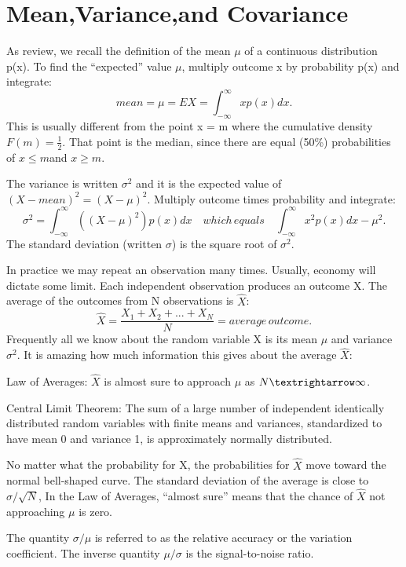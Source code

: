 \section{Mean,Variance,and Covariance}
As review, we recall the definition of the mean $\mu$ of a continuous distribution p(x). To find
the “expected” value $\mu$, multiply outcome x by probability p(x) and integrate:
\begin{equation}
	mean=\mu=E{X}=\int^\infty_{-\infty}xp(x)dx.
\end{equation} 
This is usually different from the point x = m where the cumulative density $F(m)=\frac{1}{2}$.
That point is the median, since there are equal (50\%) probabilities of $x\leq m $and $x \geq m $.

The variance is written $\sigma^2$ and it is the expected value of $(X-mean)^2=(X-\mu)^2$.
Multiply outcome times probability and integrate: 
\begin{equation}
\sigma^2=\int^\infty_{-\infty}((X-\mu)^2)p(x)dx
\quad which\,equals\quad \int^\infty_{-\infty}x^2p(x)dx-\mu^2.
\end{equation}
The standard deviation (written $\sigma$) is the square root of $\sigma^2$.

In practice we may repeat an observation many times. Usually, economy will dictate
some limit. Each independent observation produces an outcome X. The average of the
outcomes from N observations is $\hat{X}$:
\begin{equation}
\hat{X}=\frac{X_1+X_2+...+X_N}{N}=average\,outcome.
\end{equation}
Frequently all we know about the random variable X is its mean $\mu$ and variance $\sigma^2$. It is
amazing how much information this gives about the average $\hat{X}$:

Law of Averages: $\hat{X}$ is almost sure to approach $\mu$ as $N\textrightarrow \infty$.

Central Limit Theorem: The sum of a large number of independent identically distributed
random variables with finite means and variances, standardized to have mean 0 and
variance 1, is approximately normally distributed.

No matter what the probability for X, the probabilities for $\hat{X}$ move toward the normal bell-shaped curve. The standard deviation of the average is close to $\sigma/\sqrt{N}$, In the Law of Averages, “almost sure” means that the chance of $\hat{X}$ not approaching $\mu$ is zero.

The quantity $\sigma/\mu$ is referred to as the relative accuracy or the variation coefficient.
The inverse quantity $\mu/\sigma$ is the signal-to-noise ratio.

